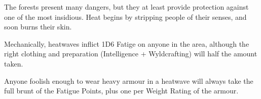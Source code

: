 \begin{multicols}{2}
The forests present many dangers, but they at least provide protection against one of the most insidious.
Heat begins by stripping people of their senses, and soon burns their skin.

Mechanically, heatwaves inflict 1D6 Fatige on anyone in the area, although the right clothing and preparation (Intelligence + Wyldcrafting) will half the amount taken.

Anyone foolish enough to wear heavy armour in a heatwave will always take the full brunt of the Fatigue Points, plus one per Weight Rating of the armour.


\end{multicols}
